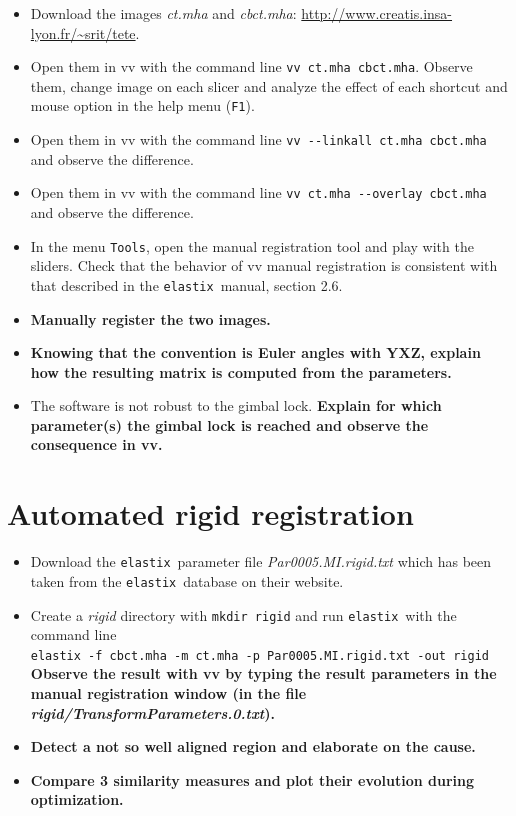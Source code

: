 \documentclass[]{report}
\newcommand{\elastix}{\texttt{elastix}}
\begin{document}
\begin{itemize}
 \item Download the images \textit{ct.mha} and \textit{cbct.mha}:
     \url{http://www.creatis.insa-lyon.fr/~srit/tete}.
 \item Open them in vv with the command line \verb+vv ct.mha cbct.mha+.
     Observe them, change image on each slicer and analyze the effect of
     each shortcut and mouse option in the help menu (\verb+F1+).
 \item Open them in vv with the command line %
  \verb+vv --linkall ct.mha cbct.mha+ and observe the difference.
 \item Open them in vv with the command line %
  \verb+vv ct.mha --overlay cbct.mha+ and observe the difference.
 \item In the menu \verb+Tools+, open the manual registration tool and play
     with the sliders. Check that the behavior of vv manual registration is
     consistent with that described in the \elastix\ manual, section 2.6.
 \item \textbf{Manually register the two images.}
 \item \textbf{Knowing that the convention is Euler angles with YXZ,
     explain how the resulting matrix is computed from the parameters.}
 \item The software is not robust to the gimbal lock. \textbf{Explain for
     which parameter(s) the gimbal lock is reached and observe the
     consequence in vv.}
\end{itemize}

\section{Automated rigid registration}

\begin{itemize}
 \item Download the \elastix\ parameter file \textit{Par0005.MI.rigid.txt}
     which has been taken from the \elastix\ database on their website.
 \item Create a \textit{rigid} directory with \verb+mkdir rigid+ and run \elastix\ with the command
 line \\
 \verb+elastix -f cbct.mha -m ct.mha -p Par0005.MI.rigid.txt -out rigid+\\
 \textbf{Observe the result with vv by typing the result parameters in the
 manual registration window (in the file
 \textit{rigid/TransformParameters.0.txt}).}
 \item \textbf{Detect a not so well aligned region and elaborate on the
     cause.}
 \item \textbf{Compare 3 similarity measures and plot their evolution
     during optimization.}
\end{itemize}
\end{document}
